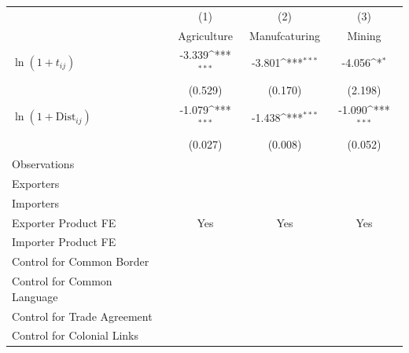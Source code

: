 {
\def\sym#1{\ifmmode^{#1}\else\(^{#1}\)\fi}
\begin{tabular}{l*{3}{c}}
\toprule
                    &\multicolumn{1}{c}{(1)}&\multicolumn{1}{c}{(2)}&\multicolumn{1}{c}{(3)}\\
                    &\multicolumn{1}{c}{Agriculture}&\multicolumn{1}{c}{Manufcaturing}&\multicolumn{1}{c}{Mining}\\
\midrule
$ \ln (1+ t_{ij}) $ &      -3.339\sym{***}&      -3.801\sym{***}&      -4.056\sym{*}  \\
                    &     (0.529)         &     (0.170)         &     (2.198)         \\
\addlinespace
$ \ln (1+ \text{Dist}_{ij}) $&      -1.079\sym{***}&      -1.438\sym{***}&      -1.090\sym{***}\\
                    &     (0.027)         &     (0.008)         &     (0.052)         \\
[2em]
Observations        &                     &                     &                     \\
Exporters           &                     &                     &                     \\
Importers           &                     &                     &                     \\
Exporter Product FE &         Yes         &         Yes         &         Yes         \\
Importer Product FE &                     &                     &                     \\
Control for Common Border&                     &                     &                     \\
Control for Common Language&                     &                     &                     \\
Control for Trade Agreement&                     &                     &                     \\
Control for Colonial Links&                     &                     &                     \\
\bottomrule
\end{tabular}
}
